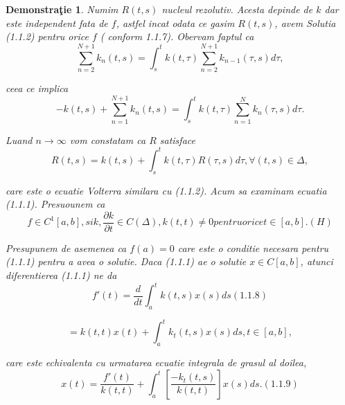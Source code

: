 \documentclass[a4paper,12pt,oneside]{report}
\newtheorem{demonstration}{Demonstra\c tie}
\begin{document}
\begin{demonstration}
	Numim \(R\left ( t,s \right )\) nucleul rezolutiv. Acesta depinde de \(k\) dar este independent fata de \(f\), astfel incat odata ce gasim \(R\left ( t,s \right )\), avem Solutia (1.1.2) pentru orice \(f\) ( conform 1.1.7). 
	Obervam faptul ca 
	\begin{displaymath}
		\sum_{n=2}^{N+1}k_{n}\left ( t,s \right ) = \int_{s}^{t}k\left ( t,\tau  \right )\sum_{n=2}^{N+1}k_{n-1}\left ( \tau ,s \right )d\tau,
	\end{displaymath}
					
	ceea ce implica 
	\begin{displaymath}
		-k\left ( t,s \right ) + \sum_{n=1}^{N+1}k_{n}\left ( t,s \right ) = \int_{s}^{t}k\left ( t,\tau  \right )\sum_{n=1}^{N}k_{n}\left ( \tau ,s \right )d\tau .
	\end{displaymath}
					
	Luand \(n\rightarrow \infty\) vom constatam ca \(R\) satisface 
	\begin{displaymath}
		R\left ( t,s \right ) = k\left ( t,s \right ) + \int_{s}^{t}k\left ( t,\tau  \right )R\left ( \tau ,s \right )d\tau , \forall \left ( t,s \right )\in \Delta , 
	\end{displaymath}
					
	care este o ecuatie Volterra similara cu (1.1.2). 
	Acum sa examinam ecuatia (1.1.1). Presuounem ca 
	\begin{displaymath}
		f\in C^{1}\left [ a,b \right ], si k, \frac{\partial k}{\partial t}\in C\left ( \Delta  \right ), k\left ( t,t \right )\neq 0 pentru orice t \in \left [ a,b \right ]. (H)
	\end{displaymath}
					
	Presupunem de asemenea ca \(f\left ( a \right ) = 0\) care este o conditie necesara pentru (1.1.1) pentru a avea o solutie. Daca (1.1.1) ae o solutie \(x\in C\left [ a,b \right ]\), atunci diferentierea (1.1.1) ne da 
	\begin{displaymath}
		{f}'\left ( t \right ) = \frac{d}{dt}\int_{a}^{t}k\left ( t,s \right )x\left ( s \right )ds (1.1.8) 
	\end{displaymath}
					 
	\begin{displaymath}
		= k\left ( t,t \right )x\left ( t \right ) + \int_{a}^{t} k_{t}\left ( t,s \right )x\left ( s \right )ds, t\in \left [ a,b \right ],
	\end{displaymath}
					 
	care este echivalenta cu urmatarea ecuatie integrala de grasul al doilea, 
	\begin{displaymath}
		x\left ( t \right ) = \frac{{f}'\left ( t \right )}{k\left ( t,t  \right )} + \int_{a}^{t} \left [ \frac{-k_{t}\left ( t,s \right )}{k\left ( t,t \right )} \right ]x\left ( s \right )ds. (1.1.9)
	\end{displaymath}
					

\end{demonstration}
\end{document}
